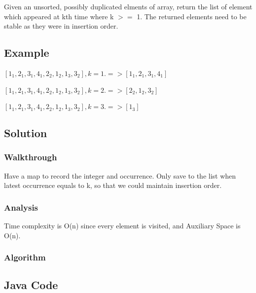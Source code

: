 \documentclass[]{book}
\begin{document}
Given an unsorted, possibly duplicated elments of array, return the list of element which appeared at kth
time where k \(>=\) 1. The returned elements need to be stable as they were in insertion order.

\hypertarget{example-12}{%
\subsection{Example}\label{example-12}}

\([1_1, 2_1, 3_1, 4_1, 2_2, 1_2, 1_3, 3_2], k = 1. => [1_1, 2_1, 3_1, 4_1]\)

\([1_1, 2_1, 3_1, 4_1, 2_2, 1_2, 1_3, 3_2], k = 2. => [2_2, 1_2, 3_2]\)

\([1_1, 2_1, 3_1, 4_1, 2_2, 1_2, 1_3, 3_2], k = 3. => [1_3]\)

\hypertarget{solution-10}{%
\subsection{Solution}\label{solution-10}}

\hypertarget{walkthrough-12}{%
\subsubsection{Walkthrough}\label{walkthrough-12}}

Have a map to record the integer and occurrence. Only save to the list when latest occurrence equals to k, so that
we could maintain insertion order.

\hypertarget{analysis-14}{%
\subsubsection{Analysis}\label{analysis-14}}

Time complexity is O(n) since every element is visited, and Auxiliary Space is O(n).

\hypertarget{algorithm-14}{%
\subsubsection{Algorithm}\label{algorithm-14}}

\hypertarget{java-code-12}{%
\subsection{Java Code}\label{java-code-12}}
\end{document}
